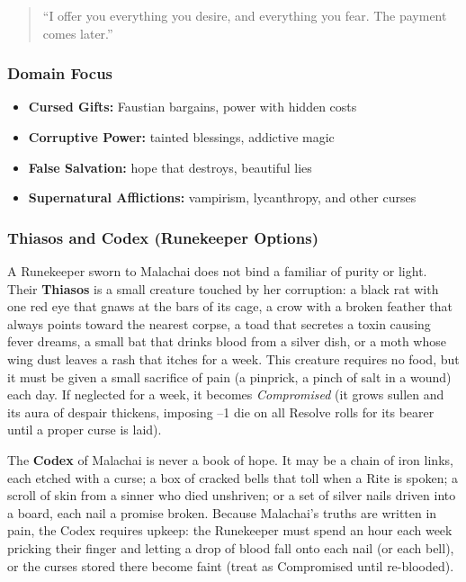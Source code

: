 \begin{quote}
``I offer you everything you desire, and everything you fear. The payment comes later.''
\end{quote}

\subsubsection*{Domain Focus}
\begin{itemize}
  \item \textbf{Cursed Gifts:} Faustian bargains, power with hidden costs
  \item \textbf{Corruptive Power:} tainted blessings, addictive magic
  \item \textbf{False Salvation:} hope that destroys, beautiful lies
  \item \textbf{Supernatural Afflictions:} vampirism, lycanthropy, and other curses
\end{itemize}

\subsubsection*{Thiasos and Codex (Runekeeper Options)}

A Runekeeper sworn to Malachai does not bind a familiar of purity or light. Their \textbf{Thiasos} is a small creature touched by her corruption: a black rat with one red eye that gnaws at the bars of its cage, a crow with a broken feather that always points toward the nearest corpse, a toad that secretes a toxin causing fever dreams, a small bat that drinks blood from a silver dish, or a moth whose wing dust leaves a rash that itches for a week. This creature requires no food, but it must be given a small sacrifice of pain (a pinprick, a pinch of salt in a wound) each day. If neglected for a week, it becomes \textit{Compromised} (it grows sullen and its aura of despair thickens, imposing --1 die on all Resolve rolls for its bearer until a proper curse is laid).

The \textbf{Codex} of Malachai is never a book of hope. It may be a chain of iron links, each etched with a curse; a box of cracked bells that toll when a Rite is spoken; a scroll of skin from a sinner who died unshriven; or a set of silver nails driven into a board, each nail a promise broken. Because Malachai's truths are written in pain, the Codex requires upkeep: the Runekeeper must spend an hour each week pricking their finger and letting a drop of blood fall onto each nail (or each bell), or the curses stored there become faint (treat as Compromised until re-blooded).

